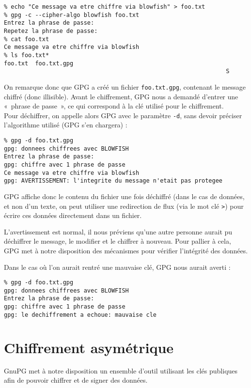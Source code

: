 \begin{lstlisting}
% echo "Ce message va etre chiffre via blowfish" > foo.txt
% gpg -c --cipher-algo blowfish foo.txt
Entrez la phrase de passe: 
Repetez la phrase de passe: 
% cat foo.txt
Ce message va etre chiffre via blowfish
% ls foo.txt*
foo.txt  foo.txt.gpg
                                                                S
\end{lstlisting}

On remarque donc que GPG a créé un fichier \texttt{foo.txt.gpg},
contenant le message chiffré (donc illisible). 
Avant le chiffrement, GPG nous a
demandé d'entrer une «~phrase de passe~», ce qui correspond à la
clé utilisé pour le chiffrement.
\\

Pour déchiffrer, on appelle alors GPG avec le paramètre
\texttt{-d}, sans devoir préciser l'algorithme utilisé (GPG s'en
chargera) : 

\begin{lstlisting}
% gpg -d foo.txt.gpg 
gpg: donnees chiffrees avec BLOWFISH
Entrez la phrase de passe: 
gpg: chiffre avec 1 phrase de passe
Ce message va etre chiffre via blowfish
gpg: AVERTISSEMENT: l'integrite du message n'etait pas protegee
\end{lstlisting}

GPG affiche donc le contenu du fichier une fois déchiffré (dans le
cas de données, et non d'un texte, on peut utiliser une
redirection de flux (via le mot clé \texttt{>}) pour écrire ces 
données directement dans un fichier.

L'avertissement est normal, il nous préviens qu'une autre personne
aurait pu déchiffrer le message, le modifier et le chiffrer à
nouveau. Pour pallier à cela, GPG met à notre disposition des
mécanismes pour vérifier l'intégrité des données. 

Dans le cas où l'on aurait rentré une mauvaise clé, GPG nous
aurait averti : 
\begin{lstlisting}
% gpg -d foo.txt.gpg
gpg: donnees chiffrees avec BLOWFISH
Entrez la phrase de passe:
gpg: chiffre avec 1 phrase de passe
gpg: le dechiffrement a echoue: mauvaise cle
\end{lstlisting}

\section{Chiffrement asymétrique}
GnuPG met à notre disposition un ensemble d'outil utilisant les
clés publiques afin de pouvoir chiffrer et de signer des données.

